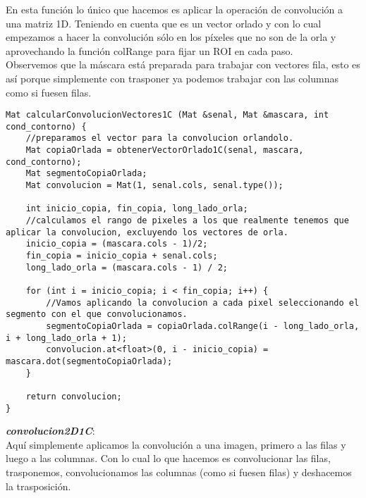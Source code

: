\documentclass[10pt,a4paper]{article}
\begin{document}
En esta función lo único que hacemos es aplicar la operación de convolución a una matriz 1D. Teniendo en cuenta que es un vector orlado y con lo cual empezamos a hacer la convolución sólo en los píxeles que no son de la orla y aprovechando la función colRange para fijar un ROI en cada paso.\\

Observemos que la máscara está preparada para trabajar con vectores fila, esto es así porque simplemente con trasponer ya podemos trabajar con las columnas como si fuesen filas.\\

\begin{lstlisting}
Mat calcularConvolucionVectores1C (Mat &senal, Mat &mascara, int cond_contorno) {
	//preparamos el vector para la convolucion orlandolo.
	Mat copiaOrlada = obtenerVectorOrlado1C(senal, mascara, cond_contorno);
	Mat segmentoCopiaOrlada;
	Mat convolucion = Mat(1, senal.cols, senal.type());

	int inicio_copia, fin_copia, long_lado_orla;
	//calculamos el rango de pixeles a los que realmente tenemos que aplicar la convolucion, excluyendo los vectores de orla.
	inicio_copia = (mascara.cols - 1)/2;
	fin_copia = inicio_copia + senal.cols;
	long_lado_orla = (mascara.cols - 1) / 2;

	for (int i = inicio_copia; i < fin_copia; i++) {
		//Vamos aplicando la convolucion a cada pixel seleccionando el segmento con el que convolucionamos.
		segmentoCopiaOrlada = copiaOrlada.colRange(i - long_lado_orla, i + long_lado_orla + 1);
		convolucion.at<float>(0, i - inicio_copia) = mascara.dot(segmentoCopiaOrlada);
	}

	return convolucion;
}
\end{lstlisting}

\textbf{\textit{convolucion2D1C}}:\\

Aquí simplemente aplicamos la convolución a una imagen, primero a las filas y luego a las columnas. Con lo cual lo que hacemos es convolucionar las filas, trasponemos, convolucionamos las columnas (como si fuesen filas) y deshacemos la trasposición.\\
\end{document}
